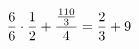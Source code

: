 \documentclass[preview]{standalone}
\begin{document}
\begin{align*}
\special{dvisvgm:raw <g id='unique000'>}\frac{6}{6} \cdot \frac{1}{2} + \frac{\frac{110}{3}}{4} = \frac{2}{3} + 9\special{dvisvgm:raw </g>}
\end{align*}
\end{document}
